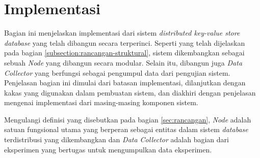 \section{Implementasi}
\label{sec:implementation}

Bagian ini menjelaskan implementasi dari sistem \textit{distributed key-value store database} yang telah dibangun secara terperinci. Seperti yang telah dijelaskan pada bagian \ref{subsection:rancangan-struktural}, sistem dikembangkan sebagai sebuah \textit{Node} yang dibangun secara modular. Selain itu, dibangun juga \textit{Data Collector} yang berfungsi sebagai pengumpul data dari pengujian sistem. Penjelasan bagian ini dimulai dari batasan implementasi, dilanjutkan dengan kakas yang digunakan dalam pembuatan sistem, dan diakhiri dengan penjelasan mengenai implementasi dari masing-masing komponen sistem.

Mengulangi definisi yang disebutkan pada bagian \ref{sec:rancangan}, \textit{Node} adalah satuan fungsional utama yang berperan sebagai entitas dalam sistem \textit{database} terdistribusi yang dikembangkan dan \textit{Data Collector} adalah bagian dari eksperimen yang bertugas untuk mengumpulkan data eksperimen.





